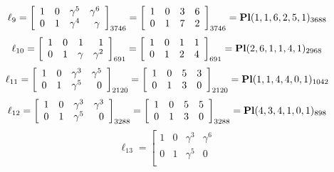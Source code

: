 \documentclass{article}
\begin{document}
{$$
\ell_{9} = 
\left[
\begin{array}{*{4}{r}}
1 & 0 & \gamma^{5} & \gamma^{6}\\
0 & 1 & \gamma^{4} & \gamma \\
\end{array}
\right]
_{3746}
=
\left[
\begin{array}{*{4}c}
1  & 0  & 3  & 6\\
0  & 1  & 7  & 2\\
\end{array}
\right]_{3746}
={\rm\bf Pl}(1,1,6,2,5,1 )_{3688}$$
$$
\ell_{10} = 
\left[
\begin{array}{*{4}{r}}
1 & 0 & 1 & 1\\
0 & 1 & \gamma  & \gamma^{2}\\
\end{array}
\right]
_{691}
=
\left[
\begin{array}{*{4}c}
1  & 0  & 1  & 1\\
0  & 1  & 2  & 4\\
\end{array}
\right]_{691}
={\rm\bf Pl}(2,6,1,1,4,1 )_{2968}$$
$$
\ell_{11} = 
\left[
\begin{array}{*{4}{r}}
1 & 0 & \gamma^{3} & \gamma^{5}\\
0 & 1 & \gamma^{5} & 0\\
\end{array}
\right]
_{2120}
=
\left[
\begin{array}{*{4}c}
1  & 0  & 5  & 3\\
0  & 1  & 3  & 0\\
\end{array}
\right]_{2120}
={\rm\bf Pl}(1,1,4,4,0,1 )_{1042}$$
$$
\ell_{12} = 
\left[
\begin{array}{*{4}{r}}
1 & 0 & \gamma^{3} & \gamma^{3}\\
0 & 1 & \gamma^{5} & 0\\
\end{array}
\right]
_{3288}
=
\left[
\begin{array}{*{4}c}
1  & 0  & 5  & 5\\
0  & 1  & 3  & 0\\
\end{array}
\right]_{3288}
={\rm\bf Pl}(4,3,4,1,0,1 )_{898}$$
$$
\ell_{13} = 
\left[
\begin{array}{*{4}{r}}
1 & 0 & \gamma^{3} & \gamma^{6}\\
0 & 1 & \gamma^{5} & 0\\
\end{array}
$$}
\end{document}
